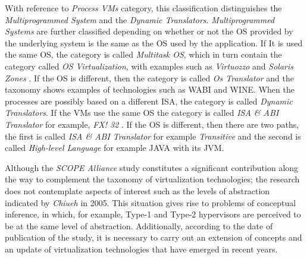 	With reference to \textit{Process VMs} category, this classification distinguishes the \textit{Multiprogrammed System} and the \textit{Dynamic Translators}. \textit{Multiprogrammed Systems} are further classified depending on whether or not the OS provided by the underlying system is the same as the OS used by the application. If It is used the same OS, the category is called \textit{Multitask OS}, which in turn contain the category called \textit{OS Virtualization}, with examples such as \textit{Virtuozzo} \cite{OpenVZ, Virtuozzo} and \textit{Solaris Zones} \cite{SolarisZones}. If the OS is different, then the category is called \textit{Os Translator} and the taxonomy shows examples of technologies such as WABI and WINE. When the processes are possibly based on a different ISA, the category is called \textit{Dynamic Translators}. If the VMs use the same OS the category is called  \textit{ISA \& ABI Translator} for example, \textit{FX! 32} \cite{Chernoff1998}. If the OS is different, then there are two paths, the first is called \textit{ISA \& ABI Translator} for example \textit{Transitive} \cite {Transitive} and the second is called \textit{High-level Language} for example JAVA with its JVM.
	
	Although the \textit{SCOPE Alliance} study  \cite{SCOPEAlliance2008} constitutes a significant contribution along the way to complement the taxonomy of virtualization technologies; the research does not contemplate aspects of interest such as the levels of abstraction indicated by \textit{Chiueh} \cite{ Chiueh2005} in 2005. This situation gives rise to problems of conceptual inference, in which, for example, Type-1 and Type-2 hypervisors are perceived to be at the same level of abstraction. Additionally, according to the date of publication of the study, it is necessary to carry out an extension of concepts and an update of virtualization technologies that have emerged in recent years.
	